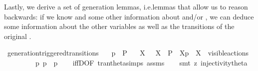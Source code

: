 \begin{isabellebody}
%
\begin{isamarkuptext}%
\pagebreak%
\end{isamarkuptext}\isamarkuptrue%
%
\isadelimdocument
%
\endisadelimdocument
%
\isatagdocument
%
\isamarkuptrue%
%
\endisatagdocument
{\isafolddocument}%
%
\isadelimdocument
%
\endisadelimdocument
%
\begin{isamarkuptext}%
Lastly, we derive a set of generation lemmas, i.e.\@ lemmas that allow us to reason backwards: if we know  and some other information about  and/or \isa{{\isasymalpha}}, we can deduce some information about the other variables as well as the transitions of the original \LTSt{}.%
\end{isamarkuptext}\isamarkuptrue%
\isamarkupfalse%
\ generation{\isacharunderscore}{\kern0pt}triggered{\isacharunderscore}{\kern0pt}transitions{\isacharcolon}{\kern0pt}\isanewline
\ \ \ {\isacartoucheopen}{\isasymtheta}{\isacharparenleft}{\kern0pt}p{\isacharparenright}{\kern0pt}\ {\isasymlongmapsto}\isactrlsup {\isasymtheta}{\isasymalpha}\ P{\isacharprime}{\kern0pt}{\isacartoucheclose}\isanewline
\ \ \ {\isacartoucheopen}{\isacharparenleft}{\kern0pt}{\isasymexists}X{\isachardot}{\kern0pt}\ {\isasymalpha}\ {\isacharequal}{\kern0pt}\ {\isasymepsilon}{\isacharbrackleft}{\kern0pt}X{\isacharbrackright}{\kern0pt}\ {\isasymand}\ P{\isacharprime}{\kern0pt}\ {\isacharequal}{\kern0pt}\ {\isasymtheta}{\isacharbrackleft}{\kern0pt}X{\isacharbrackright}{\kern0pt}{\isacharparenleft}{\kern0pt}p{\isacharparenright}{\kern0pt}\ {\isasymand}\ X\ {\isasymsubseteq}\ visible{\isacharunderscore}{\kern0pt}actions{\isacharparenright}{\kern0pt}\ \isanewline
\ \ \ \ {\isasymor}\ {\isacharparenleft}{\kern0pt}{\isasymalpha}\ {\isacharequal}{\kern0pt}\ {\isasymtau}\ {\isasymand}\ {\isacharparenleft}{\kern0pt}{\isasymexists}p{\isacharprime}{\kern0pt}{\isachardot}{\kern0pt}\ p\ {\isasymlongmapsto}{\isasymtau}\ p{\isacharprime}{\kern0pt}{\isacharparenright}{\kern0pt}{\isacharparenright}{\kern0pt}{\isacartoucheclose}\isanewline
%
\isadelimproof
\ \ %
\endisadelimproof
%
\isatagproof
{}\isamarkupfalse%
\ iffD{}{\isacharbrackleft}{\kern0pt}OF\ tran{\isacharunderscore}{\kern0pt}theta{\isachardot}{\kern0pt}simps\ assms{\isacharbrackright}{\kern0pt}\isanewline
\ \ \isamarkupfalse%
\ {\isacharparenleft}{\kern0pt}smt\ {\isacharparenleft}{\kern0pt}z{}{\isacharparenright}{\kern0pt}\ injectivity{\isacharunderscore}{\kern0pt}theta{\isacharparenleft}{\kern0pt}{}{\isacharcomma}{\kern0pt}{}{\isacharparenright}{\kern0pt}{\isacharparenright}{\kern0pt}%

\end{isabellebody}

